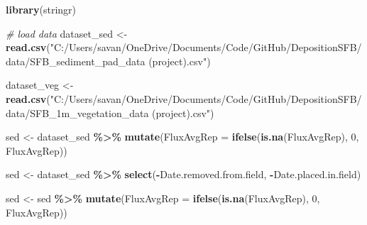 \documentclass[
]{article}
\newenvironment{Shaded}{\begin{snugshade}}{\end{snugshade}}
\newcommand{\AttributeTok}[1]{\textcolor[rgb]{0.13,0.29,0.53}{#1}}
\newcommand{\CommentTok}[1]{\textcolor[rgb]{0.56,0.35,0.01}{\textit{#1}}}
\newcommand{\DecValTok}[1]{\textcolor[rgb]{0.00,0.00,0.81}{#1}}
\newcommand{\FunctionTok}[1]{\textcolor[rgb]{0.13,0.29,0.53}{\textbf{#1}}}
\newcommand{\NormalTok}[1]{#1}
\newcommand{\OtherTok}[1]{\textcolor[rgb]{0.56,0.35,0.01}{#1}}
\newcommand{\SpecialCharTok}[1]{\textcolor[rgb]{0.81,0.36,0.00}{\textbf{#1}}}
\newcommand{\StringTok}[1]{\textcolor[rgb]{0.31,0.60,0.02}{#1}}
\begin{document}
\begin{Shaded}
\begin{Highlighting}[]
\FunctionTok{library}\NormalTok{(stringr)}
\end{Highlighting}
\end{Shaded}

\begin{Shaded}
\end{Shaded}

\begin{Shaded}
\begin{Highlighting}[]
\CommentTok{\# load data}
\NormalTok{dataset\_sed }\OtherTok{\textless{}{-}} \FunctionTok{read.csv}\NormalTok{(}\StringTok{"C:/Users/savan/OneDrive/Documents/Code/GitHub/DepositionSFB/data/SFB\_sediment\_pad\_data (project).csv"}\NormalTok{) }

\NormalTok{dataset\_veg }\OtherTok{\textless{}{-}} \FunctionTok{read.csv}\NormalTok{(}\StringTok{"C:/Users/savan/OneDrive/Documents/Code/GitHub/DepositionSFB/data/SFB\_1m\_vegetation\_data (project).csv"}\NormalTok{) }

\NormalTok{sed }\OtherTok{\textless{}{-}}\NormalTok{ dataset\_sed }\SpecialCharTok{\%\textgreater{}\%} \FunctionTok{mutate}\NormalTok{(}\AttributeTok{FluxAvgRep =} \FunctionTok{ifelse}\NormalTok{(}\FunctionTok{is.na}\NormalTok{(FluxAvgRep), }\DecValTok{0}\NormalTok{, FluxAvgRep))}

\NormalTok{sed }\OtherTok{\textless{}{-}}\NormalTok{ dataset\_sed }\SpecialCharTok{\%\textgreater{}\%}
  \FunctionTok{select}\NormalTok{(}\SpecialCharTok{{-}}\NormalTok{Date.removed.from.field, }\SpecialCharTok{{-}}\NormalTok{Date.placed.in.field)}

\NormalTok{sed }\OtherTok{\textless{}{-}}\NormalTok{ sed }\SpecialCharTok{\%\textgreater{}\%} \FunctionTok{mutate}\NormalTok{(}\AttributeTok{FluxAvgRep =} \FunctionTok{ifelse}\NormalTok{(}\FunctionTok{is.na}\NormalTok{(FluxAvgRep), }\DecValTok{0}\NormalTok{, FluxAvgRep))}


\end{Highlighting}
\end{Shaded}
\end{document}
